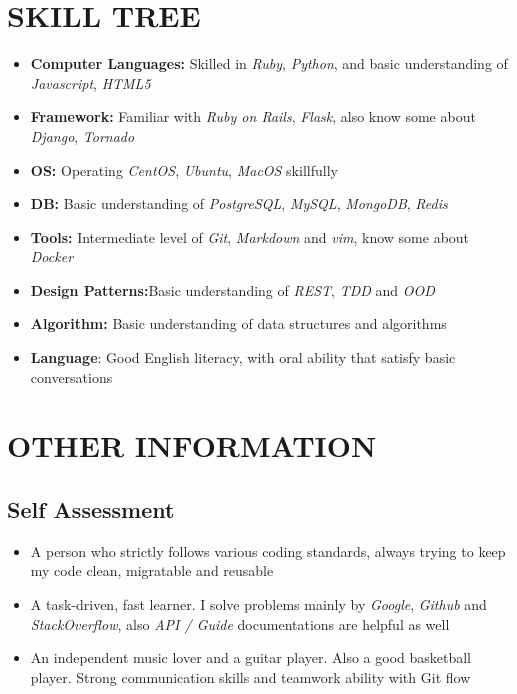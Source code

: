 \documentclass[12pt, a4paper,sans]{moderncv}       %
\begin{document}
\section{SKILL TREE}
    \begin{itemize}
        \item{\textbf{Computer Languages:} {Skilled in \textit{Ruby}, \textit{Python}, and basic understanding of \textit{Javascript}, \textit{HTML5}}}%
        \item{\textbf{Framework:} {Familiar with \textit{Ruby on Rails}, \textit{Flask}, also know some about \textit{Django}, \textit{Tornado}}}%
        \item{\textbf{OS:} {Operating \textit{CentOS}, \textit{Ubuntu}, \textit{MacOS} skillfully}}%
        \item{\textbf{DB:} {Basic understanding of \textit{PostgreSQL}, \textit{MySQL}, \textit{MongoDB}, \textit{Redis}}}%
        \item{\textbf{Tools:} {Intermediate level of \textit{Git}, \textit{Markdown} and \textit{vim}, know some about \textit{Docker}}}%
        \item{\textbf{Design Patterns:}{Basic understanding of \textit{REST}, \textit{TDD} and \textit{OOD}}}%
        \item{ \textbf{Algorithm:} {Basic understanding of data structures and algorithms}}%
        \item{\textbf{Language}: {Good English literacy, with oral ability that satisfy basic conversations} }
    \end{itemize}

\vspace{-8pt}
\section{OTHER INFORMATION}

\subsection{Self Assessment}

    \begin{itemize}
        \item{\medium A person who strictly follows various coding standards, always trying to keep my code clean, migratable and reusable}
        \item{\medium A task-driven, fast learner. I solve problems mainly by \textit{Google}, \textit{Github} and \textit{StackOverflow}, also \textit{API / Guide} documentations are helpful as well}
        \item{\medium An independent music lover and a guitar player. Also a good basketball player. Strong communication skills and teamwork ability with Git flow}
    \end{itemize}
\end{document}

